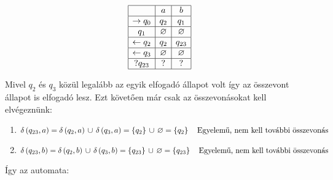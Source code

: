 \begin{example}
\begin{table}[H]
$$		\begin{array}{|c|c|c|}
			\hline
			& a & b \\
			\hline
			\rightarrow q_0 &  q_2 & q_1 \\
			\hline
			q_1 & \varnothing  &  \varnothing \\
			\hline
			\leftarrow q_2 & q_2 & q_{23}    \\
			\hline
			\leftarrow q_3 & \varnothing  & \varnothing \\
			\hline
			? q_{23}& ? & ? \\
			\hline
		\end{array}
		$$
	\end{table}
	\noindent
	Mivel $q_2$ és $q_3$ közül legalább az egyik elfogadó állapot volt így az összevont állapot is elfogadó lesz. Ezt követően már csak az összevonásokat kell elvégeznünk:
	\begin{enumerate}
		\item $ \operatorname{\delta}{(q_{23}, a)} = \operatorname{\delta}{(q_2, a)} \, \cup \, \operatorname{\delta}{(q_3, a)} = \left\lbrace q_2 \right\rbrace \, \cup \, \varnothing = \left\lbrace q_2 \right\rbrace \quad \text{Egyelemű, nem kell további összevonás} $
		\item $ \operatorname{\delta}{(q_{23}, b)} = \operatorname{\delta}{(q_2, b)} \, \cup \, \operatorname{\delta}{(q_3, b)} = \left\lbrace q_{23} \right\rbrace \, \cup \, \varnothing = \left\lbrace q_{23} \right\rbrace \quad \text{Egyelemű, nem kell további összevonás} $
	\end{enumerate}
	\noindent
	Így az automata:
	

\end{example}

